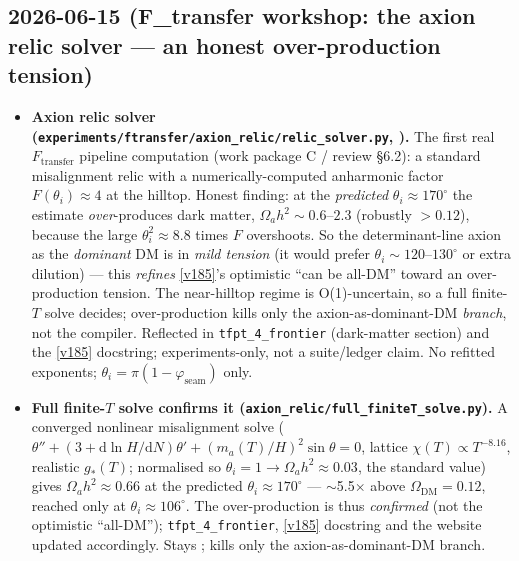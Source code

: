 \subsection*{2026-06-15 (F\_transfer workshop: the axion relic solver --- an honest over-production tension)}
\begin{itemize}
\item \textbf{Axion relic solver (\texttt{experiments/ftransfer/axion\_relic/relic\_solver.py}, \mC).} The
  first real $F_{\mathrm{transfer}}$ pipeline computation (work package C / review \S6.2): a standard
  misalignment relic with a numerically-computed anharmonic factor $F(\theta_i)\approx4$ at the hilltop.
  Honest finding: at the \emph{predicted} $\theta_i\approx170^\circ$ the estimate \emph{over}-produces dark
  matter, $\Omega_a h^2\sim0.6$--$2.3$ (robustly $>0.12$), because the large $\theta_i^2\approx8.8$ times $F$
  overshoots. So the determinant-line axion as the \emph{dominant} DM is in \emph{mild tension} (it would
  prefer $\theta_i\sim120$--$130^\circ$ or extra dilution) --- this \emph{refines} \vref{v185}'s optimistic
  ``can be all-DM'' toward an over-production tension. The near-hilltop regime is O(1)-uncertain, so a full
  finite-$T$ solve decides; over-production kills only the axion-as-dominant-DM \emph{branch}, not the
  compiler. Reflected in \texttt{tfpt\_4\_frontier} (dark-matter section) and the \vref{v185} docstring;
  experiments-only, not a suite/ledger claim. No refitted exponents; $\theta_i=\pi(1-\varphi_{\mathrm{seam}})$
  only.
\item \textbf{Full finite-$T$ solve confirms it (\texttt{axion\_relic/full\_finiteT\_solve.py}).} A converged
  nonlinear misalignment solve ($\theta''+(3+\mathrm{d}\ln H/\mathrm{d}N)\theta'+(m_a(T)/H)^2\sin\theta=0$,
  lattice $\chi(T)\propto T^{-8.16}$, realistic $g_*(T)$; normalised so $\theta_i{=}1\to\Omega_a h^2\approx0.03$,
  the standard value) gives $\Omega_a h^2\approx0.66$ at the predicted $\theta_i\approx170^\circ$ ---
  $\sim$5.5$\times$ above $\Omega_{\mathrm{DM}}=0.12$, reached only at $\theta_i\approx106^\circ$. The
  over-production is thus \emph{confirmed} (not the optimistic ``all-DM''); \texttt{tfpt\_4\_frontier},
  \vref{v185} docstring and the website updated accordingly. Stays \mC; kills only the
  axion-as-dominant-DM branch.
\end{itemize}

